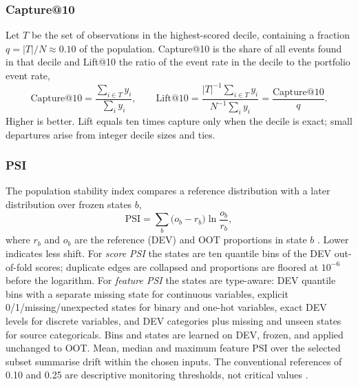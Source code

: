 \documentclass[preprint,12pt]{elsarticle}
\newcommand{\PSI}{\mathrm{PSI}}
\begin{document}
\subsubsection{Capture@10}
\label{subsubsec:capture10}
Let $T$ be the set of observations in the highest-scored decile, containing a fraction $q=|T|/N\approx0.10$ of the population. Capture@10 is the share of all events found in that decile and Lift@10 the ratio of the event rate in the decile to the portfolio event rate,
\begin{equation}
    \mathrm{Capture@10}=\frac{\sum_{i\in T}y_i}{\sum_{i}y_i},\qquad
    \mathrm{Lift@10}=\frac{|T|^{-1}\sum_{i\in T}y_i}{N^{-1}\sum_{i}y_i}=\frac{\mathrm{Capture@10}}{q}.
    \label{eq:capture10}
\end{equation}
Higher is better. Lift equals ten times capture only when the decile is exact; small departures arise from integer decile sizes and ties.

\subsubsection{PSI}
\label{subsubsec:psi}
The population stability index compares a reference distribution with a later distribution over frozen states $b$,
\begin{equation}
    \PSI=\sum_{b}\big(o_b-r_b\big)\ln\frac{o_b}{r_b},
    \label{eq:psi}
\end{equation}
where $r_b$ and $o_b$ are the reference (DEV) and OOT proportions in state $b$ \cite{siddiqi2006,yurdakul2020}. Lower indicates less shift. For \emph{score PSI} the states are ten quantile bins of the DEV out-of-fold scores; duplicate edges are collapsed and proportions are floored at $10^{-6}$ before the logarithm. For \emph{feature PSI} the states are type-aware: DEV quantile bins with a separate missing state for continuous variables, explicit 0/1/missing/unexpected states for binary and one-hot variables, exact DEV levels for discrete variables, and DEV categories plus missing and unseen states for source categoricals. Bins and states are learned on DEV, frozen, and applied unchanged to OOT. Mean, median and maximum feature PSI over the selected subset summarise drift within the chosen inputs. The conventional references of 0.10 and 0.25 are descriptive monitoring thresholds, not critical values \cite{yurdakul2020}.
\end{document}
